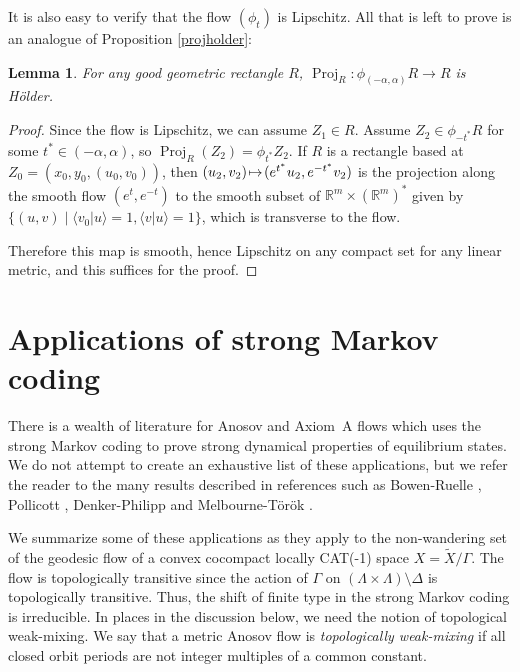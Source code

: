 \documentclass[11pt]{article}
\let\sep\mid
\def\mto{\mathchoice{\longmapsto}{\mapsto}{\mapsto}{\mapsto}}
\newtheorem{lem}[thm]{Lemma}
\theoremstyle{definition}
\numberwithin{equation}{section}
\DeclareMathOperator{\Proj}{Proj}
\begin{document}
It is also easy to verify that the flow $(\phi_t)$ is Lipschitz. All that is left to prove is an analogue of Proposition \ref{projholder}:

\begin{lem}
For any good geometric rectangle $R$, $\Proj_R:\phi_{(-\alpha,\alpha)} R \to R$ is Hölder.
\end{lem}

\begin{proof}
Since the flow is Lipschitz, we can assume $Z_1\!\in\! R$. Assume $Z_2 \!\in\! \phi_{-t^*}R$ for some $t^* \!\in\! (-\alpha, \alpha)$, so $\Proj_R(Z_2) \!=\! \phi_{t^*}Z_2$. If $R$ is a rectangle based at $Z_0\!=\!(x_0,y_0,(u_0,v_0))$, then $(u_2, v_2)\!\mto\! (e^{t^*}u_2, e^{-t^*}v_2)$ is the projection along the smooth flow $(e^t, e^{-t})$ to the smooth subset of $\mathbb{R}^m\!\times\! (\mathbb{R}^m)^*$ given by \hbox{$\{(u,v)\sep \langle v_0 | u \rangle \!=\!1, \langle v|u \rangle \!=\!1\}$}, which is transverse to the flow. \newpage

Therefore this map is smooth, hence Lipschitz on any compact set for any linear metric, and this suffices for the proof.
\end{proof}

\section{Applications of strong Markov coding}\label{s.applications}

There is a wealth of literature for Anosov and Axiom~A flows which uses the strong Markov coding to prove strong dynamical properties of equilibrium states. We do not attempt to create an exhaustive list of these applications, but we refer the reader to the many results described in references such as Bowen-Ruelle \cite{bowen-ruelle}, Pollicott \cite{pollicott}, Denker-Philipp \cite{DP84} and Melbourne-Török \cite{MT04}.

We summarize some of these applications as they apply to the non-wandering set of the geodesic flow of a convex cocompact locally CAT(-1) space $X = \tilde X/\Gamma$. The flow is topologically transitive since the action of $\Gamma$ on $(\Lambda \times \Lambda)\setminus \Delta$ is topologically transitive. Thus, the shift of finite type in the strong Markov coding is irreducible. In places in the discussion below, we need the notion of topological weak-mixing. We say that a metric Anosov flow is \emph{topologically weak-mixing} if all closed orbit periods are not integer multiples of a common constant.
\end{document}
